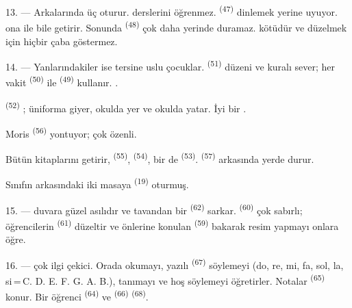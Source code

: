 13. --- Arkalarında üç  oturur.  derslerini
öğrenmez.  \textsuperscript{(47)} dinlemek yerine uyuyor.
 ona  ile  bile getirir. Sonunda
 \textsuperscript{(48)} çok daha yerinde duramaz.
 kötüdür ve düzelmek için hiçbir çaba göstermez.

14. --- Yanlarındakiler ise tersine uslu çocuklar. 
\textsuperscript{(51)} düzeni ve kuralı sever; her vakit 
\textsuperscript{(50)} ile  \textsuperscript{(49)}
kullanır. .

 \textsuperscript{(52)} ; üniforma
giyer, okulda yer ve okulda yatar. İyi bir .

Moris  \textsuperscript{(56)} 
yontuyor; çok özenli.

Bütün kitaplarını getirir,  \textsuperscript{(55)},
 \textsuperscript{(54)}, bir de 
\textsuperscript{(53)}.  \textsuperscript{(57)} arkasında yerde
durur.

Sınıfın arkasındaki iki masaya  \textsuperscript{(19)}
oturmuş.

\VUsaut{4.6mm}
\VUsaut{3.4mm}

15. ---  duvara güzel  asılıdır ve
tavandan  bir  \textsuperscript{(62)} sarkar.
 \textsuperscript{(60)} çok sabırlı; öğrencilerin
 \textsuperscript{(61)} düzeltir ve önlerine konulan
 \textsuperscript{(59)} bakarak resim yapmayı onlara öğre.

16. ---  çok ilgi çekici. Orada  okumayı,
 yazılı  \textsuperscript{(67)} söylemeyi (do,
re, mi, fa, sol, la, si\,=\,C. D. E. F. G. A. B.), 
tanımayı ve hoş  söylemeyi öğretirler. Notalar  \textsuperscript{(65)} konur. Bir öğrenci 
\textsuperscript{(64)} ve  \textsuperscript{(66)}
 \textsuperscript{(68)}.

